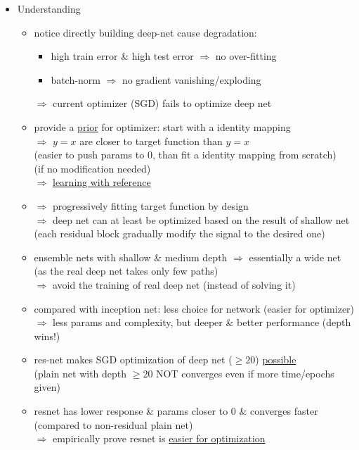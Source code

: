 \begin{itemize}
\begin{itemize}
	\item Understanding
		\begin{itemize}
		\item notice directly building deep-net cause degradation:
			\begin{itemize}
			\item high train error \& high test error $\Rightarrow$ no over-fitting
			\item batch-norm $\Rightarrow$ no gradient vanishing/exploding
			\end{itemize}
		$\Rightarrow$ current optimizer (SGD) fails to optimize deep net
		\item provide a \underline{prior} for optimizer: start with a identity mapping \\
		$\Rightarrow$ $y=x$ are closer to target function than $y=x$ \\
		(easier to push params to $0$, than fit a identity mapping from scratch) \\
		(if no modification needed) \\
		$\Rightarrow$ \underline{learning with reference}
		\item $\Rightarrow$ progressively fitting target function by design \\
		$\Rightarrow$ deep net can at least be optimized based on the result of shallow net \\
		(each residual block gradually modify the signal to the desired one)
		\item ensemble nets with shallow \& medium depth $\Rightarrow$ essentially a wide net \\
		(as the real deep net takes only few paths) \\
		$\Rightarrow$ avoid the training of real deep net (instead of solving it)
		\item compared with inception net: less choice for network (easier for optimizer) \\
		$\Rightarrow$ less params and complexity, but deeper \& better performance (depth wins!)
		\item res-net makes SGD optimization of deep net ($\ge 20$) \underline{possible} \\
		(plain net with depth $\ge20$ NOT converges even if more time/epochs given)
		\item resnet has lower response \& params closer to $0$ \& converges faster \\
		(compared to non-residual plain net) \\
		$\Rightarrow$ empirically prove resnet is \underline{easier for optimization}
		\end{itemize}
	\end{itemize}
	
\end{itemize}

